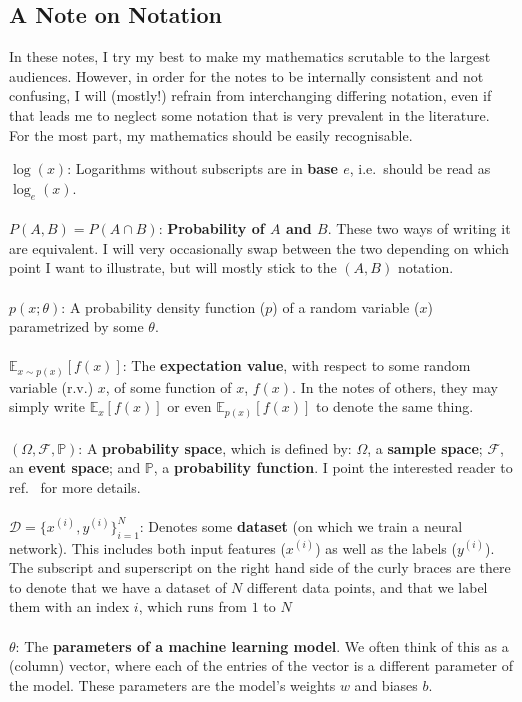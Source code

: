 \documentclass[]{article}
\begin{document}
\subsection{A Note on Notation}
In these notes, I try my best to make my mathematics scrutable to the largest audiences. However, in order for the notes to be internally consistent and not confusing, I will (mostly!) refrain from interchanging differing notation, even if that leads me to neglect some notation that is very prevalent in the literature. For the most part, my mathematics should be easily recognisable. 

\begin{notationbox}

$\log(x)$: Logarithms without subscripts are in \textbf{base $e$}, i.e.\ should be read as $\log_e (x)$.
\\\\
$P(A,B)=P(A\cap B)$: \textbf{Probability of $A$ \textbf{and} $B$}. These two ways of writing it are equivalent. I will very occasionally swap between the two depending on which point I want to illustrate, but will mostly stick to the $(A,B)$ notation.
\\\\
$p(x;\theta)$: A probability density function ($p$) of a random variable ($x$) parametrized by some $\theta$.
\\\\
$\mathbb{E}_{x \sim p(x)}\left[f(x)\right]$: The \textbf{expectation value}, with respect to some random variable (r.v.) $x$, of some function of $x$, $f(x)$. In the notes of others, they may simply write $\mathbb{E}_x \left[f(x)\right]$ or even $\mathbb{E}_{p(x)} \left[f(x)\right]$ to denote the same thing.
\\\\
$(\Omega, \mathcal{F}, \mathbb{P})$: A \textbf{probability space}, which is defined by: $\Omega$, a \textbf{sample space}; $\mathcal{F}$, an \textbf{event space}; and $\mathbb{P}$, a \textbf{probability function}. I point the interested reader to ref.~\cite{Weber2014} for more details.
\\\\
$\mathcal{D}=\{ x^{(i)}, y^{(i)} \}_{i=1}^N$: Denotes some \textbf{dataset} (on which we train a neural network). This includes both input features ($x^{(i)}$) as well as the labels ($y^{(i)}$). The subscript and superscript on the right hand side of the curly braces are there to denote that we have a dataset of $N$ different data points, and that we label them with an index $i$, which runs from $1$ to $N$
\\\\
$\theta$: The \textbf{parameters of a machine learning model}. We often think of this as a (column) vector, where each of the entries of the vector is a different parameter of the model. These parameters are the model's weights $w$ and biases $b$.

\end{notationbox}
\end{document}
